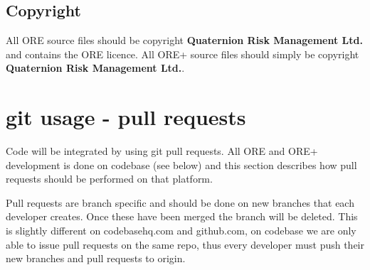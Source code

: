 \documentclass[12pt, a4paper]{article}
\begin{document}
\subsection*{Copyright}
All ORE source files should be copyright \textbf{Quaternion Risk Management Ltd.} and contains the ORE licence.
All ORE+ source files should simply be copyright \textbf{Quaternion Risk Management Ltd.}.

\section*{git usage - pull requests}
Code will be integrated by using git pull requests. All ORE and ORE+ development is done on codebase (see below) and this section describes how pull requests should be performed on that platform.

Pull requests are branch specific and should be done on new branches that each developer creates. Once these have been merged the branch will be deleted. This is slightly different on codebasehq.com and github.com, on codebase we are only able to issue pull requests on the same repo, thus every developer must push their new branches and pull requests to origin.
\end{document}
